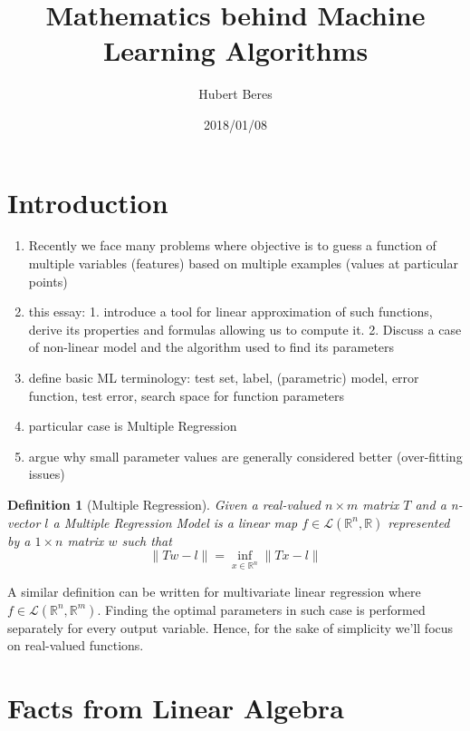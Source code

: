 \documentclass[a4paper]{article}
\title{Mathematics behind Machine Learning Algorithms}
\author{Hubert Beres}
\date{2018/01/08}
\theoremstyle{break}
\newtheorem{definition}{Definition}[section]
\newcommand{\R}{\mathbb{R}}
\begin{document}
\maketitle

\section{Introduction}

\begin{enumerate}
    \item Recently we face many problems where objective is to guess a function of multiple variables (features) based on multiple examples (values at particular points)
    \item this essay:
        1. introduce a tool for linear approximation of such functions, derive its properties and formulas allowing us to compute it.
        2. Discuss a case of non-linear model and the algorithm used to find its parameters
    \item define basic ML terminology: test set, label, (parametric) model, error function, test error, search space for function parameters
    \item particular case is Multiple Regression
    \item argue why small parameter values are generally considered better (over-fitting issues)

\end{enumerate}

\begin{definition}[Multiple Regression]
    Given a real-valued $ n \times m$ matrix $T$ and a n-vector $l$ a Multiple Regression Model is a linear map $f \in \mathcal{L} ( \R ^n, \R)$ represented by a $ 1 \times n$ matrix $w$ such that
    \begin{equation}
        \| T w - l \| = \inf\limits_{x \in \R^n} \| T x - l \|
    \end{equation}
\end{definition}    
A similar definition can be written for multivariate linear regression where $ f \in \mathcal{L} ( \R ^n, \R^m)$. Finding the optimal parameters in such case is performed separately for every output variable. Hence, for the sake of simplicity we'll focus on real-valued functions.

\section{Facts from Linear Algebra}
\end{document}
